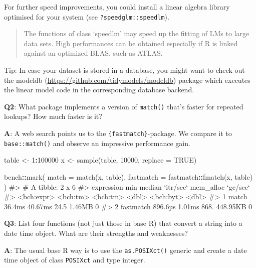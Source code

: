 \documentclass[
]{krantz}
\makeatletter
\newenvironment{Shaded}{\begin{snugshade}}{\end{snugshade}}
\newcommand{\CommentTok}[1]{\textcolor[rgb]{0.56,0.35,0.01}{\textit{#1}}}
\newcommand{\DataTypeTok}[1]{\textcolor[rgb]{0.13,0.29,0.53}{#1}}
\newcommand{\DecValTok}[1]{\textcolor[rgb]{0.00,0.00,0.81}{#1}}
\newcommand{\KeywordTok}[1]{\textcolor[rgb]{0.13,0.29,0.53}{\textbf{#1}}}
\newcommand{\NormalTok}[1]{#1}
\newcommand{\OperatorTok}[1]{\textcolor[rgb]{0.81,0.36,0.00}{\textbf{#1}}}
\newcommand{\OtherTok}[1]{\textcolor[rgb]{0.56,0.35,0.01}{#1}}
\newcommand{\StringTok}[1]{\textcolor[rgb]{0.31,0.60,0.02}{#1}}
\renewcommand{\href}[2]{#2 (\url{#1})}
\newenvironment{kframe}{%
\medskip{}
\setlength{\fboxsep}{.8em}
 \def\at@end@of@kframe{}%
 \ifinner\ifhmode%
  \def\at@end@of@kframe{\end{minipage}}%
  \begin{minipage}{\columnwidth}%
 \fi\fi%
 \def\FrameCommand##1{\hskip\@totalleftmargin \hskip-\fboxsep
 \colorbox{shadecolor}{##1}\hskip-\fboxsep
     \hskip-\linewidth \hskip-\@totalleftmargin \hskip\columnwidth}%
 \MakeFramed {\advance\hsize-\width
   \@totalleftmargin\z@ \linewidth\hsize
   \@setminipage}}%
 {\par\unskip\endMakeFramed%
 \at@end@of@kframe}
\renewenvironment{Shaded}{\begin{kframe}}{\end{kframe}}
\renewcommand{\KeywordTok} [1]{\textcolor[rgb]{0.00,0.44,0.13}{{#1}}}
\renewcommand{\DataTypeTok}[1]{\textcolor[rgb]{0.56,0.13,0.00}{{#1}}}
\renewcommand{\DecValTok}  [1]{\textcolor[rgb]{0.25,0.63,0.44}{{#1}}}
\renewcommand{\StringTok}  [1]{\textcolor[rgb]{0.25,0.44,0.63}{{#1}}}
\renewcommand{\CommentTok} [1]{\textcolor[rgb]{0.38,0.63,0.69}{{#1}}}
\renewcommand{\OtherTok}   [1]{\textcolor[rgb]{0.00,0.44,0.13}{{#1}}}
\renewcommand{\NormalTok}  [1]{{#1}}
\makeatother
\begin{document}
For further speed improvements, you could install a linear algebra library optimised for your system (see \texttt{?speedglm::speedlm}).

\begin{quote}
The functions of class `speedlm' may speed up the fitting of LMs to large data sets. High performances can be obtained especially if R is linked against an optimized BLAS, such as ATLAS.
\end{quote}

Tip: In case your dataset is stored in a database, you might want to check out the \href{https://github.com/tidymodels/modeldb}{modeldb} package which executes the linear model code in the corresponding database backend.

\textbf{{Q2}}: What package implements a version of \texttt{match()} that's faster for repeated lookups? How much faster is it?

\textbf{{A}}: A web search points us to the \texttt{\{fastmatch\}}-package. We compare it to \texttt{base::match()} and observe an impressive performance gain.

\begin{Shaded}
\begin{Highlighting}[]
\NormalTok{table <-}\StringTok{ }\DecValTok{1}\OperatorTok{:}\DecValTok{100000}
\NormalTok{x <-}\StringTok{ }\KeywordTok{sample}\NormalTok{(table, }\DecValTok{10000}\NormalTok{, }\DataTypeTok{replace =} \OtherTok{TRUE}\NormalTok{)}

\NormalTok{bench}\OperatorTok{::}\KeywordTok{mark}\NormalTok{(}
  \DataTypeTok{match =} \KeywordTok{match}\NormalTok{(x, table),}
  \DataTypeTok{fastmatch =}\NormalTok{ fastmatch}\OperatorTok{::}\KeywordTok{fmatch}\NormalTok{(x, table)}
\NormalTok{) }
\CommentTok{#> # A tibble: 2 x 6}
\CommentTok{#>   expression      min   median `itr/sec` mem_alloc `gc/sec`}
\CommentTok{#>   <bch:expr> <bch:tm> <bch:tm>     <dbl> <bch:byt>    <dbl>}
\CommentTok{#> 1 match        36.4ms  40.67ms      24.5    1.46MB        0}
\CommentTok{#> 2 fastmatch   896.6µs   1.01ms     868.   448.95KB        0}
\end{Highlighting}
\end{Shaded}

\textbf{{Q3}}: List four functions (not just those in base R) that convert a string into a date time object. What are their strengths and weaknesses?

\textbf{{A}}: The usual base R way is to use the \texttt{as.POSIXct()} generic and create a date time object of class \texttt{POSIXct} and type integer.
\end{document}
